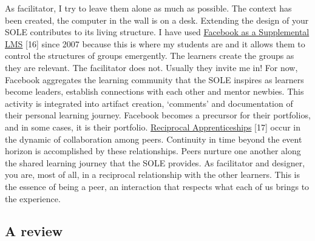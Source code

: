 As facilitator, I try to leave them alone as much as possible. The
context has been created, the computer in the wall is on a desk.
Extending the design of your SOLE contributes to its living structure. I
have used
\href{http://community.telecentre.org/profiles/blogs/facebook-as-a-supplemental-lms}{Facebook
as a Supplemental LMS} {{[}16{]}} since 2007 because this is where my
students are and it allows them to control the structures of groups
emergently. The learners create the groups as they are relevant. The
facilitator does not. Usually they invite me in! For now, Facebook
aggregates the learning community that the SOLE inspires as learners
become leaders, establish connections with each other and mentor
newbies. This activity is integrated into artifact creation, `comments'
and documentation of their personal learning journey. Facebook becomes a
precursor for their portfolios, and in some cases, it is their
portfolio.
\href{http://starwars.wikia.com/wiki/Reciprocal_apprenticeship}{Reciprocal
Apprenticeships} {{[}17{]}} occur in the dynamic of collaboration among
peers. Continuity in time beyond the event horizon is accomplished by
these relationships. Peers nurture one another along the shared learning
journey that the SOLE provides. As facilitator and designer, you are,
most of all, in a reciprocal relationship with the other learners. This
is the essence of being a peer, an interaction that respects what each
of us brings to the experience.

\subsection{A review}\label{a-review}

